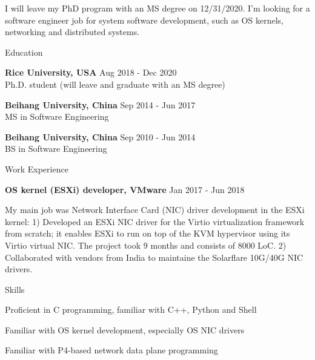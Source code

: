 \documentclass{resume} %
\begin{document}


I will leave my PhD program with an MS degree on 12/31/2020.
I'm looking for a software engineer job for system software development,
such as OS kernels, networking and distributed systems.


\begin{rSection}{Education}

{\bf Rice University, USA} \hfill { Aug 2018 - Dec 2020}
\\ Ph.D. student (will leave and graduate with an MS degree)

{\bf Beihang University, China} \hfill { Sep 2014 - Jun 2017}
\\ MS in Software Engineering

{\bf Beihang University, China} \hfill { Sep 2010 - Jun 2014}
\\ BS in Software Engineering

\end{rSection}



\begin{rSection}{Work Experience}

\item {\bf OS kernel (ESXi) developer, VMware} \hfill { Jan 2017 - Jun 2018}

My main job was Network Interface Card (NIC) driver development in the
ESXi kernel:
1) Developed an ESXi NIC driver for the Virtio virtualization framework from
scratch; it enables ESXi to run on top of the KVM hypervisor using its Virtio virtual
NIC. The project took 9 months and consists of 8000 LoC.
2) Collaborated with vendors from India to maintaine the Solarflare 10G/40G NIC drivers.


\end{rSection}



\begin{rSection}{Skills} \itemsep -3pt

\item Proficient in C programming, familiar with C++, Python and Shell
\item Familiar with OS kernel development, especially OS NIC drivers
\item Familiar with P4-based network data plane programming

\end{rSection}
\end{document}
